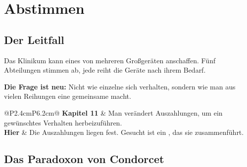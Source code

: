 \chapter{Abstimmen}

\section{Der Leitfall}

\begin{merksatz}
Das Klinikum kann eines von mehreren Großgeräten anschaffen. Fünf Abteilungen stimmen ab, jede reiht die Geräte nach ihrem Bedarf.

\begin{center}
\begin{minipage}{0.9\textwidth}
\textbf{Die Frage ist neu:} Nicht wie einzelne sich verhalten, sondern wie man aus vielen Reihungen eine gemeinsame macht.
\end{minipage}
\end{center}

\begin{center}
{\small
\renewcommand{\arraystretch}{1.5}
\begin{tabular}{@{}P{2.4cm}P{6.2cm}@{}}
\toprule
\textbf{Kapitel 11} & Man verändert Auszahlungen, um ein gewünschtes Verhalten herbeizuführen.\\
\textbf{Hier} & Die Auszahlungen liegen fest. Gesucht ist ein , das sie zusammenführt.\\
\bottomrule
\end{tabular}}
\end{center}

\begin{center}
\begin{minipage}{0.88\textwidth}
\end{minipage}
\end{center}
\end{merksatz}

\section{Das Paradoxon von Condorcet}

